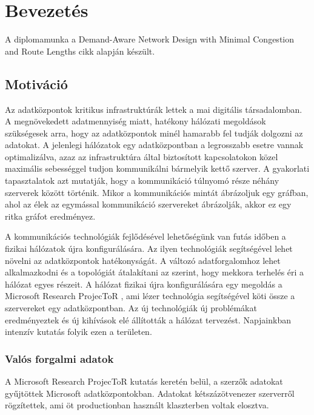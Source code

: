 \documentclass[12pt]{report}
\begin{document}
\tableofcontents
	
\chapter{Bevezetés}

A diplomamunka a Demand-Aware Network Design with Minimal Congestion and Route Lengths \cite{avin_demand-aware_nodate} cikk alapján készült.

\section{Motiváció}

Az adatközpontok kritikus infrastruktúrák lettek a mai digitális társadalomban. 
A megnövekedett adatmennyiség miatt, hatékony hálózati megoldások szükségesek arra, hogy az adatközpontok minél hamarabb fel tudják dolgozni az adatokat. 
A jelenlegi hálózatok egy adatközpontban a legrosszabb esetre vannak optimalizálva, azaz az infrastruktúra által biztosított kapcsolatokon közel maximális sebességgel tudjon kommunikálni bármelyik kettő szerver. 
A gyakorlati tapasztalatok azt mutatják, hogy a kommunikáció túlnyomó része néhány szerverek között történik. 
Mikor a kommunikációs mintát ábrázoljuk egy gráfban, ahol az élek az egymással kommunikáció szervereket ábrázolják, akkor ez egy ritka gráfot eredményez.

A kommunikációs technológiák fejlődésével lehetőségünk van futás időben a fizikai hálózatok újra konfigurálására. 
Az ilyen technológiák segítségével lehet növelni az adatközpontok hatékonyságát. 
A változó adatforgalomhoz lehet alkalmazkodni és a topológiát átalakítani az szerint, hogy mekkora terhelés éri a hálózat egyes részeit. 
A hálózat fizikai újra konfigurálására egy megoldás a Microsoft Research ProjecToR \cite{ghobadi_projector:_2016}, ami lézer technológia segítségével köti össze a szervereket egy adatközpontban. 
Az új technológiák új problémákat eredményeztek és új kihívások elé állították a hálózat tervezést.
Napjainkban intenzív kutatás folyik ezen a területen.

\pagebreak

\subsection{Valós forgalmi adatok}

A Microsoft Research ProjecToR kutatás keretén belül, a szerzők adatokat gyűjtöttek Microsoft adatközpontokban. 
Adatokat kétszázötvenezer szerverről rögzítettek, ami öt productionban használt klaszterben voltak elosztva. 
\end{document}
